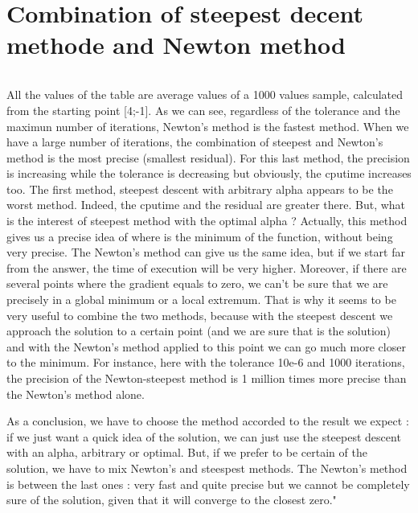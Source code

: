 \documentclass[a4paper,12pt]{article}
\begin{document}
\section{Combination of steepest decent methode and Newton method}
\begin{lstlisting}

\end{lstlisting}
All the values of the table are average values of a 1000 values sample, calculated from the starting point [4;-1].
As we can see, regardless of the tolerance and the maximun number of iterations, Newton's method is the fastest method. 
When we have a large number of iterations, the combination of steepest and Newton's method is the most precise (smallest residual). 
For this last method, the precision is increasing while the tolerance is decreasing but obviously, the cputime increases too.
The first method, steepest descent with arbitrary alpha appears to be the worst method. Indeed, the cputime and the residual are greater there. 
But, what is the interest of steepest method with the optimal alpha ? 
Actually, this method gives us a precise idea of where is the minimum of the function, without being very precise. 
The Newton's method can give us the same idea, but if we start far from the answer, the time of execution will be very higher. 
Moreover, if there are several points where the gradient equals to zero, we can't be sure that we are precisely in a global minimum or a local extremum. 
That is why it seems to be very useful to combine the two methods, because with the steepest descent we approach the solution to a certain point (and we are sure that is the solution) and with the Newton's method applied to this point we can go much more closer to the minimum. 
For instance, here with the tolerance 10e-6 and 1000 iterations, the precision of the Newton-steepest method is 1 million times more precise than the Newton's method alone. 


 As a conclusion, we have to choose the method accorded to the result we expect :
 if we just want a quick idea of the solution, we can just use the steepest descent with an alpha, arbitrary or optimal. But, if we prefer to be certain of the solution, we have to mix Newton's and steespest methods.
The Newton's method is between the last ones : 
very fast and quite precise but we cannot be completely sure of the solution, given that it will converge to the closest zero." 
\end{document}

